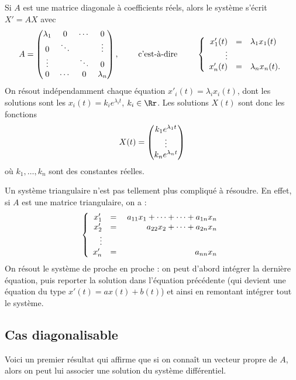 \documentclass[12pt, class=report,crop=false]{standalone}
\begin{document}
\begin{exemple}
Si $A$ est une matrice diagonale à coefficients réels, alors le système s'écrit $X'=AX$ avec 
$$A = \begin{pmatrix}
\lambda_1&0&\cdots &0\cr
0& \ddots & &\vdots \cr
\vdots & &\ddots&0\cr
0&\cdots&0&\lambda_n
\end{pmatrix},
\qquad \text{ c'est-à-dire }\qquad
\left\{\begin{array}{rcl}
x'_1(t)&=& \lambda_1 x_1(t)\cr
\vdots&& \cr 
x'_n(t) &=& \lambda_n x_n(t).
\end{array}\right.
$$
On résout indépendamment chaque équation $x'_i(t) = \lambda_i x_i(t)$, dont les solutions
sont les $x_i(t) = k_i e^{\lambda_i t}$, $k_i \in \Rr$.
Les solutions $X(t)$ sont donc les fonctions 
$$X(t) = \begin{pmatrix}
k_1 e^{\lambda_1 t}\cr
\vdots\cr
k_n e^{\lambda_n t}\cr
\end{pmatrix}$$
où $k_1,\ldots,k_n$ sont des constantes réelles.

\end{exemple}


\begin{exemple}
Un système triangulaire n'est pas tellement plus compliqué à résoudre.
En effet, si $A$ est une matrice triangulaire, on a :
$$\left\{\begin{array}{rcr}
x'_1 &=& a_{11}x_1+\cdots+\cdots+a_{1n}x_n\cr
x'_2 &=& \quad \quad \ \ a_{22}x_2+\cdots+a_{2n}x_n\cr
\vdots&&\cr 
x'_n&=& \quad\quad\quad \quad \quad\quad \ \ a_{nn}x_n
\end{array}\right.$$
On résout le système de proche en proche :
on peut d'abord intégrer la dernière équation, puis reporter 
la solution dans l'équation précédente (qui devient une équation du type
$x'(t) = ax(t) + b(t)$) et ainsi en remontant intégrer tout le système.
\end{exemple}





\subsection{Cas diagonalisable}

Voici un premier résultat qui affirme que si on connaît un vecteur propre de $A$, alors on peut lui associer une solution du système différentiel.
\end{document}
